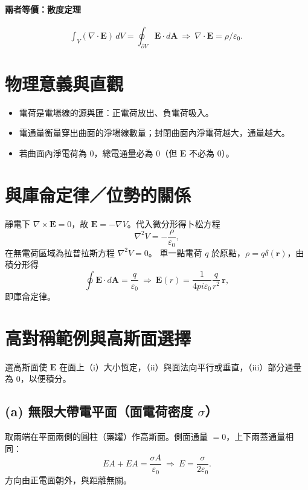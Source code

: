 \documentclass{article}
\def\pi{pi}%
\def\hat#1{#1}%
\def\int{\text{∫}}%
\begin{document}
\paragraph{兩者等價：散度定理}
\begin{equation}
\int_V (\nabla\!\cdot\!\mathbf{E})\,dV
=\oint_{\partial V}\mathbf{E}\cdot d\mathbf{A}
\ \Rightarrow\ 
\nabla\!\cdot\!\mathbf{E}=\rho/\varepsilon_0.
\end{equation}

\section{物理意義與直觀}
\begin{itemize}[leftmargin=1.5em]
\item 電荷是電場線的源與匯：正電荷放出、負電荷吸入。
\item 電通量衡量穿出曲面的淨場線數量；封閉曲面內淨電荷越大，通量越大。
\item 若曲面內淨電荷為 $0$，總電通量必為 $0$（但 $\mathbf{E}$ 不必為 $0$）。
\end{itemize}

\section{與庫侖定律／位勢的關係}
靜電下 $\nabla\times\mathbf{E}=0$，故 $\mathbf{E}=-\nabla V$。代入微分形得卜松方程
\begin{equation}
\nabla^2 V = -\frac{\rho}{\varepsilon_0},
\end{equation}
在無電荷區域為拉普拉斯方程 $\nabla^2 V=0$。
單一點電荷 $q$ 於原點，$\rho=q\delta(\mathbf{r})$，由積分形得
\begin{equation}
\oint \mathbf{E}\cdot d\mathbf{A}=\frac{q}{\varepsilon_0}
\ \Rightarrow\
\mathbf{E}(r)=\frac{1}{4\pi\varepsilon_0}\frac{q}{r^2}\,\hat{\mathbf{r}},
\end{equation}
即庫侖定律。

\section{高對稱範例與高斯面選擇}
選高斯面使 $\mathbf{E}$ 在面上（i）大小恆定，（ii）與面法向平行或垂直，（iii）部分通量為 $0$，以便積分。

\subsection*{(a) 無限大帶電平面（面電荷密度 $\sigma$）}
取兩端在平面兩側的圓柱（藥罐）作高斯面。側面通量 $=0$，上下兩蓋通量相同：
\begin{equation}
EA + EA = \frac{\sigma A}{\varepsilon_0}
\ \Rightarrow\
E=\frac{\sigma}{2\varepsilon_0}.
\end{equation}
方向由正電面朝外，與距離無關。
\end{document}
